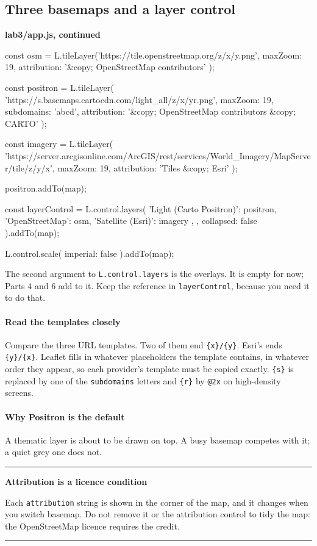 \documentclass{article}
\newcommand{\cd}[1]{\texttt{#1}}
\newcommand{\codecap}[1]{%
  \par\vspace{.9em}\noindent\textbf{#1}\par\vspace{-.6em}}
\newenvironment{keypoint}[1]
  {\par\vspace{.7em}\noindent\rule{\linewidth}{.6pt}\par\vspace{.15em}
   \noindent\textbf{#1}\par\nobreak\vspace{-.3em}}
  {\par\vspace{.15em}\noindent\rule{\linewidth}{.6pt}\par\vspace{.7em}}
\begin{document}
\subsection{Three basemaps and a layer control}

\codecap{lab3/app.js, continued}
\begin{code}
const osm = L.tileLayer('https://tile.openstreetmap.org/{z}/{x}/{y}.png', {
  maxZoom: 19,
  attribution: '&copy; OpenStreetMap contributors'
});

const positron = L.tileLayer(
  'https://{s}.basemaps.cartocdn.com/light_all/{z}/{x}/{y}{r}.png', {
  maxZoom: 19,
  subdomains: 'abcd',
  attribution: '&copy; OpenStreetMap contributors &copy; CARTO'
});

const imagery = L.tileLayer(
  'https://server.arcgisonline.com/ArcGIS/rest/services/World_Imagery/MapServer/tile/{z}/{y}/{x}', {
  maxZoom: 19,
  attribution: 'Tiles &copy; Esri'
});

positron.addTo(map);

const layerControl = L.control.layers(
  {
    'Light (Carto Positron)': positron,
    'OpenStreetMap': osm,
    'Satellite (Esri)': imagery
  },
  {},
  { collapsed: false }
).addTo(map);

L.control.scale({ imperial: false }).addTo(map);
\end{code}

The second argument to \cd{L.control.layers} is the overlays. It is
empty for now; Parts 4 and 6 add to it. Keep the reference in
\cd{layerControl}, because you need it to do that.

\paragraph{Read the templates closely}
Compare the three URL templates. Two of them end \cd{\{x\}/\{y\}}. Esri's
ends \cd{\{y\}/\{x\}}. Leaflet fills in whatever placeholders the
template contains, in whatever order they appear, so each provider's
template must be copied exactly. \cd{\{s\}} is replaced by one of the
\cd{subdomains} letters and \cd{\{r\}} by \cd{@2x} on high-density
screens.

\paragraph{Why Positron is the default}
A thematic layer is about to be drawn on top. A busy basemap competes
with it; a quiet grey one does not.

\begin{keypoint}{Attribution is a licence condition}
Each \cd{attribution} string is shown in the corner of the map, and it
changes when you switch basemap. Do not remove it or the attribution
control to tidy the map: the OpenStreetMap licence requires the credit.
\end{keypoint}
\end{document}
